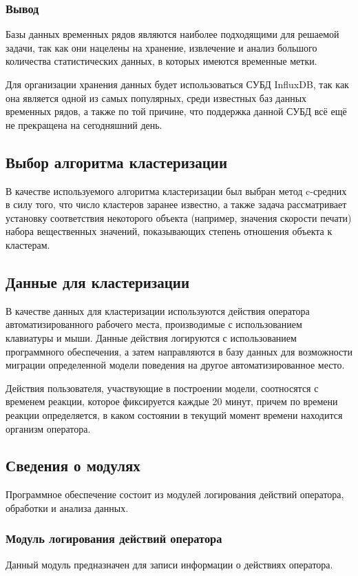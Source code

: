 \subsubsection*{Вывод}
Базы данных временных рядов являются наиболее подходящими для решаемой задачи, так как они нацелены на хранение, извлечение и анализ большого количества статистических данных, в которых имеются временные метки.

Для организации хранения данных будет использоваться СУБД InfluxDB, так как она является одной из самых популярных, среди известных баз данных временных рядов, а также по той причине, что поддержка данной СУБД всё ещё не прекращена на сегодняшний день.

\subsection{Выбор алгоритма кластеризации}
В качестве используемого алгоритма кластеризации был выбран метод c-средних в силу того, что число кластеров заранее известно, а также задача рассматривает установку соответствия некоторого объекта (например, значения скорости печати) набора вещественных значений, показывающих степень отношения объекта к кластерам.

\subsection{Данные для кластеризации}
В качестве данных для кластеризации используются действия оператора автоматизированного рабочего места, производимые с использованием клавиатуры и мыши. Данные действия логируются с использованием программного обеспечения, а затем направляются в базу данных для возможности миграции определенной модели поведения на другое автоматизированное место.

Действия пользователя, участвующие в построении модели, соотносятся с временем реакции, которое фиксируется каждые 20 минут, причем по времени реакции определяется, в каком состоянии в текущий момент времени находится организм оператора.

\subsection{Сведения о модулях}
Программное обеспечение состоит из модулей логирования действий оператора, обработки и анализа данных.

\subsubsection{Модуль логирования действий оператора}
Данный модуль предназначен для записи информации о действиях оператора.

